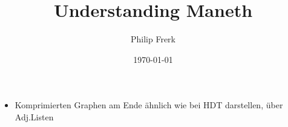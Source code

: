 \documentclass[a4paper]{scrartcl}
\title{Understanding Maneth}
\author{Philip Frerk}
\date{\today}
\begin{document}
\maketitle



\begin{itemize}
	\item Komprimierten Graphen am Ende ähnlich wie bei HDT darstellen, über Adj.Listen
\end{itemize}
\end{document}
